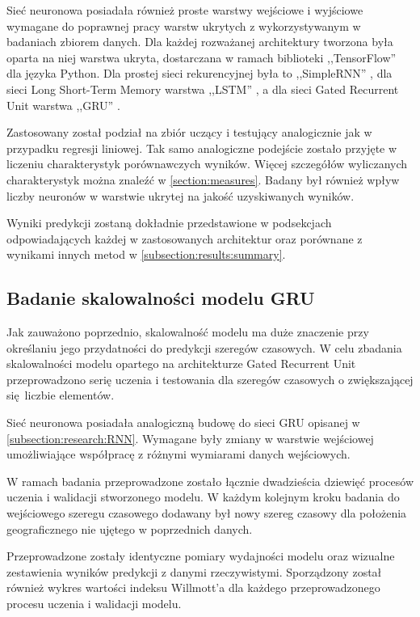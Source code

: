 \documentclass[10pt,a4paper]{article}
\begin{document}
Sieć neuronowa posiadała również proste warstwy wejściowe i wyjściowe wymagane do poprawnej pracy warstw ukrytych z wykorzystywanym w badaniach zbiorem danych.
Dla każdej rozważanej architektury tworzona była oparta na niej warstwa ukryta, dostarczana w ramach biblioteki ,,TensorFlow'' dla języka Python. Dla prostej sieci rekurencyjnej była to ,,SimpleRNN'' \cite{tfSimpleRNN}, dla sieci Long Short-Term Memory  warstwa ,,LSTM'' \cite{tfLSTM}, a dla sieci Gated Recurrent Unit warstwa ,,GRU'' \cite{tfGRU}.

Zastosowany został podział na zbiór uczący i testujący analogicznie jak w przypadku regresji liniowej. Tak samo analogiczne podejście zostało przyjęte w liczeniu charakterystyk porównawczych wyników. Więcej szczegółów wyliczanych charakterystyk można znaleźć w \autoref{section:measures}.
Badany był również wpływ liczby neuronów w warstwie ukrytej na jakość uzyskiwanych wyników. 

Wyniki predykcji zostaną dokładnie przedstawione w podsekcjach odpowiadających każdej w zastosowanych architektur oraz porównane z wynikami innych metod w \autoref{subsection:results:summary}.


\subsection{Badanie skalowalności modelu GRU}
Jak zauważono poprzednio, skalowalność modelu ma duże znaczenie przy określaniu jego przydatności do predykcji szeregów czasowych. W celu zbadania skalowalności modelu opartego na architekturze Gated Recurrent Unit przeprowadzono serię uczenia i testowania dla szeregów czasowych o zwiększającej się liczbie elementów. 

Sieć neuronowa posiadała analogiczną budowę do sieci GRU opisanej w \autoref{subsection:research:RNN}. Wymagane były zmiany w warstwie wejściowej umożliwiające współpracę z różnymi wymiarami danych wejściowych.

W ramach badania przeprowadzone zostało łącznie dwadzieścia dziewięć procesów uczenia i walidacji stworzonego modelu. W każdym kolejnym kroku badania do wejściowego szeregu czasowego dodawany był nowy szereg czasowy dla położenia geograficznego nie ujętego w poprzednich danych. 

Przeprowadzone zostały identyczne pomiary wydajności modelu oraz wizualne zestawienia wyników predykcji z danymi rzeczywistymi. Sporządzony został również wykres wartości indeksu Willmott'a dla każdego przeprowadzonego procesu uczenia i walidacji modelu.
\end{document}
